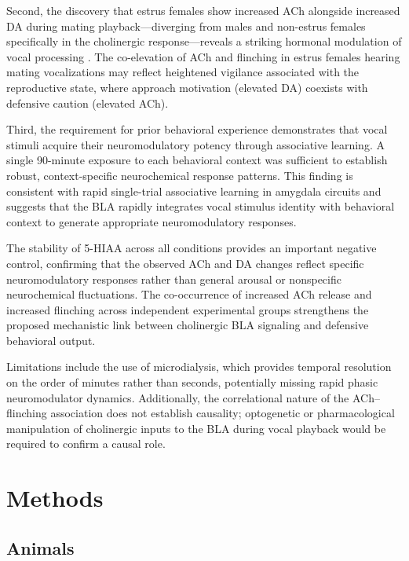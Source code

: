 \documentclass[11pt]{article}
\begin{document}
Second, the discovery that estrus females show increased ACh alongside increased DA during mating playback---diverging from males and non-estrus females specifically in the cholinergic response---reveals a striking hormonal modulation of vocal processing \citep{knox2016estrous}. The co-elevation of ACh and flinching in estrus females hearing mating vocalizations may reflect heightened vigilance associated with the reproductive state, where approach motivation (elevated DA) coexists with defensive caution (elevated ACh).

Third, the requirement for prior behavioral experience demonstrates that vocal stimuli acquire their neuromodulatory potency through associative learning. A single 90-minute exposure to each behavioral context was sufficient to establish robust, context-specific neurochemical response patterns. This finding is consistent with rapid single-trial associative learning in amygdala circuits \citep{ledoux2000emotion, likhtik2014prefrontal} and suggests that the BLA rapidly integrates vocal stimulus identity with behavioral context to generate appropriate neuromodulatory responses.

The stability of 5-HIAA across all conditions provides an important negative control, confirming that the observed ACh and DA changes reflect specific neuromodulatory responses rather than general arousal or nonspecific neurochemical fluctuations. The co-occurrence of increased ACh release and increased flinching across independent experimental groups strengthens the proposed mechanistic link between cholinergic BLA signaling and defensive behavioral output.

Limitations include the use of microdialysis, which provides temporal resolution on the order of minutes rather than seconds, potentially missing rapid phasic neuromodulator dynamics. Additionally, the correlational nature of the ACh--flinching association does not establish causality; optogenetic or pharmacological manipulation of cholinergic inputs to the BLA during vocal playback would be required to confirm a causal role.

\section{Methods}

\subsection{Animals}
\end{document}
